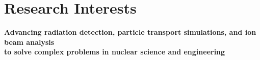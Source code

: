 \documentclass[10pt]{article}
\begin{document}

%
%


\newlength{\rcollength}\setlength{\rcollength}{3.0in}%
\newlength{\spacewidth}\setlength{\spacewidth}{20pt}
\newcommand\spacechar{$|$}

\section{Research Interests}
\textbf{Advancing radiation detection, particle transport simulations,
  and ion beam analysis \\ to solve complex problems in nuclear
  science and engineering}\vspace{0.1cm}
\end{document}

